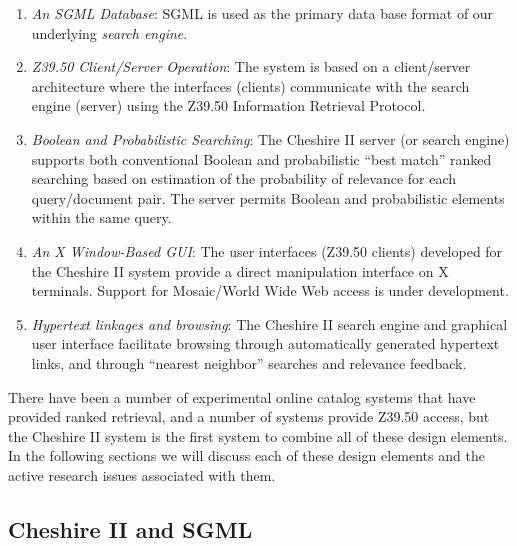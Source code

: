 \begin{enumerate}

\item {\em An SGML Database}: SGML\cite{GOLDFARB} is used as the
primary data base format of our underlying {\em search engine}.

\item {\em Z39.50 Client/Server Operation}: The system is based on a 
client/server architecture where the interfaces (clients)
communicate with the search engine (server) using the Z39.50
Information Retrieval Protocol\cite{ANSI}.

\item {\em Boolean and Probabilistic Searching}: The Cheshire II
server (or search engine) supports both conventional Boolean and
probabilistic ``best match'' ranked searching based on estimation of
the probability of relevance for each query/document pair. The server 
permits Boolean and probabilistic elements within the same
query.

\item {\em An X Window-Based GUI}: The user interfaces (Z39.50 clients) 
developed for the Cheshire II system provide a
direct manipulation interface on
X terminals. Support for Mosaic/World Wide Web access is under development.

\item {\em Hypertext linkages and browsing}: 
The Cheshire II search engine and graphical user interface facilitate
browsing through automatically generated hypertext links, and
through ``nearest neighbor'' searches and relevance feedback.

\end{enumerate}

There have been a number of experimental online catalog systems that
have provided ranked retrieval\cite{FOX93,EVAL,OKAPI1,OKAPI2,PORTER}, and
a number of systems provide Z39.50 access, but the Cheshire II system
is the first system to combine all of these design elements.
In the following sections we will discuss each of these design elements
and the active research issues associated with them.

\subsection{Cheshire II and SGML}

